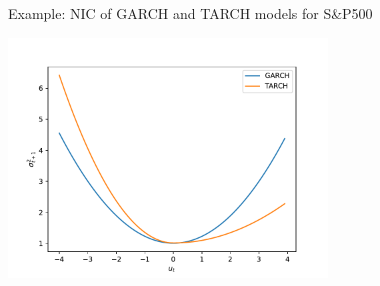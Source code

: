 \begin{frame}%

\begin{block}{Example: NIC of GARCH and TARCH models for S\&P500}
\centerline{\includegraphics[height=2.5in]{NIC}}
\end{block}

\end{frame}%
%
%
%
%
%
